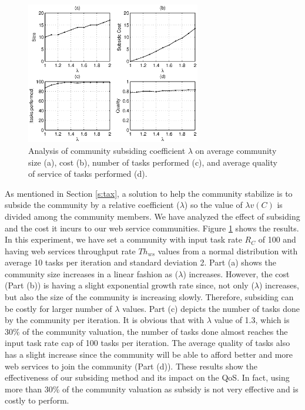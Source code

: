 \begin{figure}%
\centering
\includegraphics[width=3in]{Figures/taxtation.eps}
\caption{Analysis of community subsiding coefficient $\lambda$ on
average community size (a), cost (b), number of tasks performed
(c), and average quality of service of tasks performed (d).}
\label{f_taxtation}
\end{figure}

As mentioned in Section \ref{s:tax}, a solution to help the
community stabilize is to subside the community by a relative
coefficient ($\lambda$) so the value of $\lambda v(C)$ is divided
among the community members. We have analyzed the effect of
subsiding and the cost it incurs to our web service communities.
Figure \ref{f_taxtation} shows the results. In this experiment, we
have set a community with input task rate $R_C$ of 100 and having
web services throughput rate $Th_{ws}$ values from a normal
distribution with average 10 tasks per iteration and standard
deviation 2. Part (a) shows the community size increases in a
linear fashion as ($\lambda$) increases. However, the cost (Part
(b)) is having a slight exponential growth rate since, not only
($\lambda$) increases, but also the size of the community is
increasing slowly. Therefore, subsiding can be costly for larger
number of $\lambda$ values. Part (c) depicts the number of tasks
done by the community per iteration. It is obvious that with
$\lambda$ value of 1.3, which is 30\% of the community valuation,
the number of tasks done almost reaches the input task rate cap of
100 tasks per iteration. The average quality of tasks also has a
slight increase since the community will be able to afford better
and more web services to join the community (Part (d)). These
results show the effectiveness of our subsiding method and its
impact on the QoS. In fact, using more than 30\% of the community
valuation as subsidy is not very effective and is costly to
perform.

